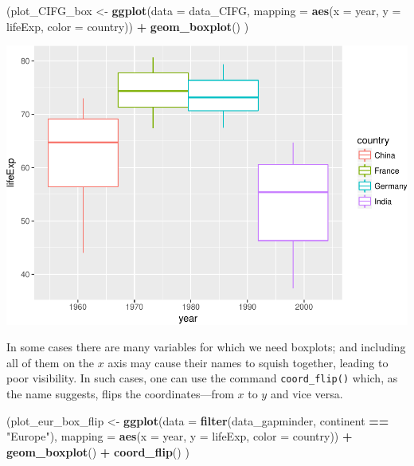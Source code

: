 \documentclass[]{article}
\newenvironment{Shaded}{\begin{snugshade}}{\end{snugshade}}
\newcommand{\KeywordTok}[1]{\textcolor[rgb]{0.13,0.29,0.53}{\textbf{#1}}}
\newcommand{\DataTypeTok}[1]{\textcolor[rgb]{0.13,0.29,0.53}{#1}}
\newcommand{\StringTok}[1]{\textcolor[rgb]{0.31,0.60,0.02}{#1}}
\newcommand{\OperatorTok}[1]{\textcolor[rgb]{0.81,0.36,0.00}{\textbf{#1}}}
\newcommand{\NormalTok}[1]{#1}
\begin{document}
\begin{Shaded}
\begin{Highlighting}[]
\NormalTok{(plot_CIFG_box <-}\StringTok{ }\KeywordTok{ggplot}\NormalTok{(}\DataTypeTok{data =}\NormalTok{ data_CIFG,}
                         \DataTypeTok{mapping =} \KeywordTok{aes}\NormalTok{(}\DataTypeTok{x =}\NormalTok{ year, }
                                       \DataTypeTok{y =}\NormalTok{ lifeExp,}
                                       \DataTypeTok{color =}\NormalTok{ country)) }\OperatorTok{+}
\StringTok{   }\KeywordTok{geom_boxplot}\NormalTok{()}
\NormalTok{   )}
\end{Highlighting}
\end{Shaded}

\includegraphics{Intro_ggplot_files/figure-latex/plot_CIFG_box-1.pdf}

In some cases there are many variables for which we need boxplots; and
including all of them on the \(x\) axis may cause their names to squish
together, leading to poor visibility. In such cases, one can use the
command \texttt{coord\_flip()} which, as the name suggests, flips the
coordinates---from \(x\) to \(y\) and vice versa.

\begin{Shaded}
\begin{Highlighting}[]
\NormalTok{(plot_eur_box_flip <-}\StringTok{ }\KeywordTok{ggplot}\NormalTok{(}\DataTypeTok{data =} \KeywordTok{filter}\NormalTok{(data_gapminder,}
\NormalTok{                                           continent }\OperatorTok{==}\StringTok{ "Europe"}\NormalTok{),}
                         \DataTypeTok{mapping =} \KeywordTok{aes}\NormalTok{(}\DataTypeTok{x =}\NormalTok{ year, }
                                       \DataTypeTok{y =}\NormalTok{ lifeExp,}
                                       \DataTypeTok{color =}\NormalTok{ country)) }\OperatorTok{+}
\StringTok{   }\KeywordTok{geom_boxplot}\NormalTok{() }\OperatorTok{+}
\StringTok{   }\KeywordTok{coord_flip}\NormalTok{()}
\NormalTok{   )}
\end{Highlighting}
\end{Shaded}
\end{document}

